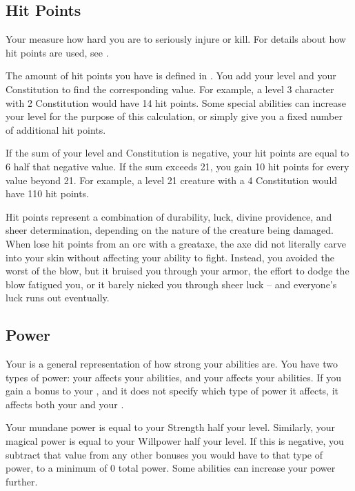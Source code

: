     \subsection{Hit Points}\label{Hit Points}
        Your  measure how hard you are to seriously injure or kill.
        For details about how hit points are used, see .

        The amount of hit points you have is defined in .
        You add your level and your Constitution to find the corresponding value.
        For example, a level 3 character with 2 Constitution would have 14 hit points.
        Some special abilities can increase your level for the purpose of this calculation, or simply give you a fixed number of additional hit points.

        If the sum of your level and Constitution is negative, your hit points are equal to 6 \add half that negative value.
        If the sum exceeds 21, you gain 10 hit points for every value beyond 21.
        For example, a level 21 creature with a 4 Constitution would have 110 hit points.

         Hit points represent a combination of durability, luck, divine providence, and sheer determination, depending on the nature of the creature being damaged.
        When lose hit points from an orc with a greataxe, the axe did not literally carve into your skin without affecting your ability to fight.
        Instead, you avoided the worst of the blow, but it bruised you through your armor, the effort to dodge the blow fatigued you, or it barely nicked you through sheer luck -- and everyone's luck runs out eventually.

    \subsection{Power}\label{Power}
        Your  is a general representation of how strong your abilities are.
        You have two types of power: your  affects your \magical abilities, and your  affects your  abilities.
        If you gain a bonus to your , and it does not specify which type of power it affects, it affects both your  and your .

        Your mundane power is equal to your Strength \add half your level.
        Similarly, your magical power is equal to your Willpower \add half your level.
        If this is negative, you subtract that value from any other bonuses you would have to that type of power, to a minimum of 0 total power.
        Some abilities can increase your power further.


